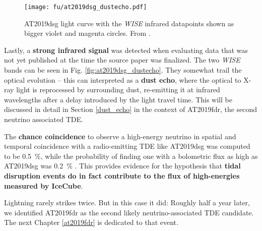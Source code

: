 \begin{figure}[htb]
    \texttt{[image: fu/at2019dsg\_dustecho.pdf]}
    \caption[AT2019dsg infrared light curve]{AT2019dsg light curve with the \textit{WISE} infrared datapoints shown as bigger violet and magenta circles. From \cite{Reusch2023b}.}
\end{figure}

Lastly, a \textbf{strong infrared signal} was detected when evaluating   data that was not yet published at the time the source paper was finalized. The two \textit{WISE} bands can be seen in Fig. \ref{fig:at2019dsg_dustecho}. They somewhat trail the optical evolution -- this can interpreted as a \textbf{dust echo}, where the optical to X-ray light is reprocessed by surrounding dust, re-emitting it at infrared wavelengths after a delay introduced by the light travel time. This will be discussed in detail in Section \ref{dust_echo} in the context of AT2019fdr, the second neutrino associated TDE.

The \textbf{chance coincidence} to observe a high-energy neutrino in spatial and temporal coincidence with a radio-emitting TDE like AT2019dsg was computed to be \SI{0.5}{\percent}, while the probability of finding one with a bolometric flux as high as AT2019dsg was \SI{0.2}{\percent} \cite{Stein2021}. This provides evidence for the hypothesis that \textbf{tidal disruption events do in fact contribute to the flux of high-energies measured by IceCube}.

Lightning rarely strikes twice. But in this case it did: Roughly half a year later, we identified AT2019fdr as the second likely neutrino-associated TDE candidate. The next Chapter \ref{at2019fdr} is dedicated to that event.
